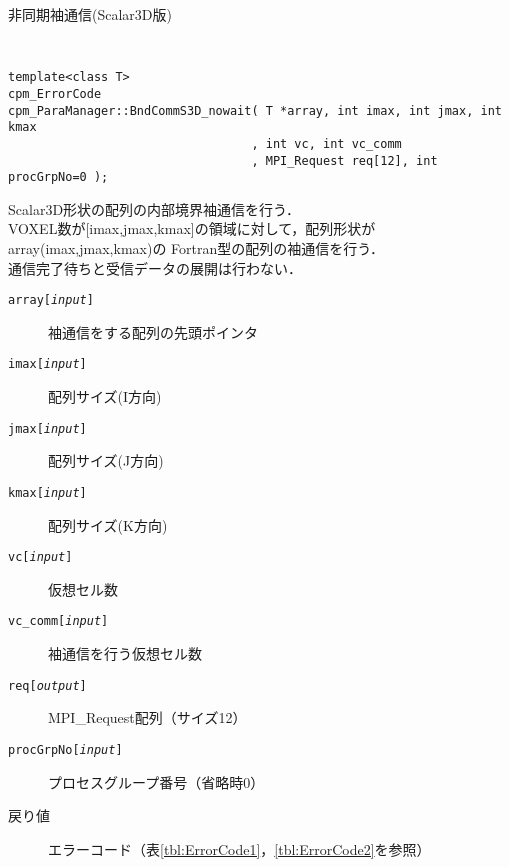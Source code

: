 \begin{spacing}{0.8}
\begin{itembox}[l]{非同期袖通信(Scalar3D版)}
{\tt
\begin{verbatim}
template<class T>
cpm_ErrorCode
cpm_ParaManager::BndCommS3D_nowait( T *array, int imax, int jmax, int kmax
                                  , int vc, int vc_comm
                                  , MPI_Request req[12], int procGrpNo=0 );
\end{verbatim}
}
Scalar3D形状の配列の内部境界袖通信を行う．\\
VOXEL数が[imax,jmax,kmax]の領域に対して，配列形状がarray(imax,jmax,kmax)の
Fortran型の配列の袖通信を行う．\\
通信完了待ちと受信データの展開は行わない．
\begin{description}
\item[{\tt array[{\it input}]}] 袖通信をする配列の先頭ポインタ
\item[{\tt imax[{\it input}]}] 配列サイズ(I方向)
\item[{\tt jmax[{\it input}]}] 配列サイズ(J方向)
\item[{\tt kmax[{\it input}]}] 配列サイズ(K方向)
\item[{\tt vc[{\it input}]}] 仮想セル数
\item[{\tt vc\_comm[{\it input}]}] 袖通信を行う仮想セル数
\item[{\tt req[{\it output}]}] MPI\_Request配列（サイズ12）
\item[{\tt procGrpNo[{\it input}]}] プロセスグループ番号（省略時0）
\\
\item[戻り値] エラーコード（表\ref{tbl:ErrorCode1}，\ref{tbl:ErrorCode2}を参照）
\end{description}
\end{itembox}\\
\end{spacing}

